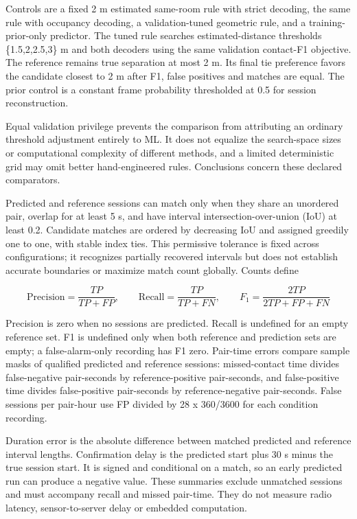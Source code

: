 \documentclass[12pt,a4paper]{report}
\begin{document}
Controls are a fixed 2 m estimated same-room rule with strict decoding, the same rule with occupancy decoding, a validation-tuned geometric rule, and a training-prior-only predictor. The tuned rule searches estimated-distance thresholds \{1.5,2,2.5,3\} m and both decoders using the same validation contact-F1 objective. The reference remains true separation at most 2 m. Its final tie preference favors the candidate closest to 2 m after F1, false positives and matches are equal. The prior control is a constant frame probability thresholded at 0.5 for session reconstruction.

Equal validation privilege prevents the comparison from attributing an ordinary threshold adjustment entirely to ML. It does not equalize the search-space sizes or computational complexity of different methods, and a limited deterministic grid may omit better hand-engineered rules. Conclusions concern these declared comparators.

Predicted and reference sessions can match only when they share an unordered pair, overlap for at least 5 s, and have interval intersection-over-union (IoU) at least 0.2. Candidate matches are ordered by decreasing IoU and assigned greedily one to one, with stable index ties. This permissive tolerance is fixed across configurations; it recognizes partially recovered intervals but does not establish accurate boundaries or maximize match count globally. Counts define

\begin{equation}
\mathrm{Precision}=\frac{TP}{TP+FP},\qquad\mathrm{Recall}=\frac{TP}{TP+FN},\qquad F_1=\frac{2TP}{2TP+FP+FN}
\label{eq:source10}
\end{equation}

Precision is zero when no sessions are predicted. Recall is undefined for an empty reference set. F1 is undefined only when both reference and prediction sets are empty; a false-alarm-only recording has F1 zero. Pair-time errors compare sample masks of qualified predicted and reference sessions: missed-contact time divides false-negative pair-seconds by reference-positive pair-seconds, and false-positive time divides false-positive pair-seconds by reference-negative pair-seconds. False sessions per pair-hour use FP divided by 28 x 360/3600 for each condition recording.

Duration error is the absolute difference between matched predicted and reference interval lengths. Confirmation delay is the predicted start plus 30 s minus the true session start. It is signed and conditional on a match, so an early predicted run can produce a negative value. These summaries exclude unmatched sessions and must accompany recall and missed pair-time. They do not measure radio latency, sensor-to-server delay or embedded computation.
\end{document}
